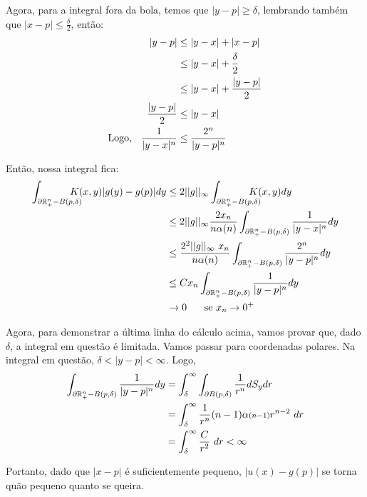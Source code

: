 \documentclass[11pt]{article}
\newcommand{\p}{\partial}
\begin{document}
\begin{itemize}
	Agora, para a integral fora da bola, temos que \(|y - p| \geq \delta\), lembrando também que \(|x - p| \leq \frac{\delta}{2}\), então:
	\begin{align*}
		|y-p| &\leq |y-x| + |x - p|\\
		&\leq |y - x| + \frac{\delta}{2} \\
		&\leq |y - x| + \frac{|y-p|}{2} \\
		\frac{|y-p|}{2} &\leq |y-x| \\ \text{Logo, }\hspace{.2cm}
		\frac{1}{|y-x|^n} &\leq \frac{2^n}{|y-p|^n}
	\end{align*}

	Então, nossa integral fica:
	\begin{align*}
		\int_{\p\seR - B(p, \delta)} \hspace{-0.5cm} K(x,y) | g(y) - g(p) | dy &\leq 2 || g||_{\infty} \int_{\p\seR - B(p, \delta)} \hspace{-0.5cm} K(x,y) dy \\
		&\leq 2 || g||_{\infty} \frac{2x_n}{n \alpha(n)} \int_{\p\seR - B(p, \delta)} \frac{1}{|y-x|^n} dy \\
		&\leq \frac{2^2 || g||_{\infty}\ x_n}{n \alpha(n)} \int_{\p\seR - B(p, \delta)} \frac{2^n}{|y-p|^n} dy \\
		&\leq C x_n \int_{\p\seR - B(p, \delta)} \frac{1}{|y-p|^n} dy \\
		&\rightarrow 0\hspace{.5cm} \text{ se } x_n \rightarrow 0^+
	\end{align*}

	Agora, para demonstrar a última linha do cálculo acima, vamos provar que, dado \(\delta\), a integral em questão é limitada. Vamos passar para coordenadas polares. Na integral em questão, \(\delta < |y-p| < \infty\). Logo, \begin{align*}
	\int_{\p\seR - B(p, \delta)} \frac{1}{|y-p|^n} dy &= \int_\delta^\infty \int_{\p B(p,\delta)} \frac{1}{r^n} dS_y dr \\
	&= \int_\delta^\infty  \frac{1}{r^n} (n-1) \alpha{\scriptstyle (n-1)} r^{n-2} \ dr \\
	&= \int_\delta^\infty \frac{C}{r^2}\ dr < \infty
	\end{align*}



	Portanto, dado que \(|x-p|\) é suficientemente pequeno, \(|u(x) - g(p)|\) se torna quão pequeno quanto se queira.
	
\end{itemize}
\end{document}
